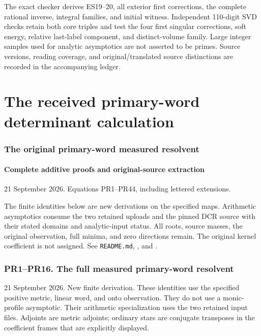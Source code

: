 \documentclass[11pt]{article}
\begin{document}
The exact checker derives ES19--20, all exterior first corrections, the complete rational inverse, integral families, and initial witness. Independent 110-digit SVD checks retain both core triples and test the four first singular corrections, soft energy, relative last-label component, and distinct-volume family. Large integer samples used for analytic asymptotics are not asserted to be primes. Source versions, reading coverage, and original/translated source distinctions are recorded in the accompanying ledger.

\clearpage\part{The received primary-word determinant calculation}
\section{The original primary-word measured resolvent}\label{the-original-primary-word-measured-resolvent}

\subsection{Complete additive proofs and original-source extraction}\label{complete-additive-proofs-and-original-source-extraction}

21 September 2026. Equations PR1--PR44, including lettered extensions.

The finite identities below are new derivations on the specified maps. Arithmetic asymptotics consume the two retained uploads and the pinned DCR source with their stated domains and analytic-input status. All roots, source masses, the original observation, full minima, and zero directions remain. The original kernel coefficient is not assigned. See \texttt{README.md}, , and .

\section{PR1--PR16. The full measured primary-word resolvent}\label{pr1pr16.-the-full-measured-primary-word-resolvent}

21 September 2026. New finite derivation. These identities use the specified positive metric, linear word, and onto observation. They do not use a monic-profile asymptotic. Their arithmetic specialization uses the two retained input files. Adjoints are metric adjoints; ordinary stars are conjugate transposes in the coefficient frames that are explicitly displayed.
\end{document}
